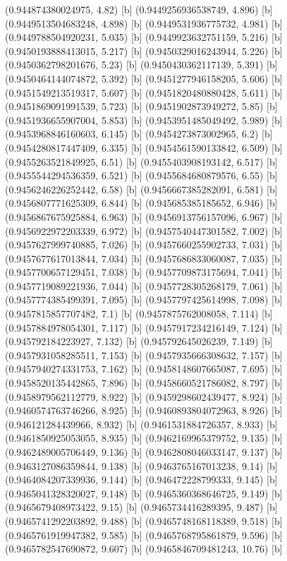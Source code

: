 {{{(0.944874380024975, 4.82) [b] 
(0.9449256936538749, 4.896) [b] 
(0.9449513504683248, 4.898) [b] 
(0.9449531936775732, 4.981) [b] 
(0.9449788504920231, 5.035) [b] 
(0.9449923632751159, 5.216) [b] 
(0.9450193888413015, 5.217) [b] 
(0.9450329016243944, 5.226) [b] 
(0.9450362798201676, 5.23) [b] 
(0.9450430362117139, 5.391) [b] 
(0.9450464144074872, 5.392) [b] 
(0.9451277946158205, 5.606) [b] 
(0.9451549213519317, 5.607) [b] 
(0.9451820480880428, 5.611) [b] 
(0.9451869091991539, 5.723) [b] 
(0.9451902873949272, 5.85) [b] 
(0.9451936655907004, 5.853) [b] 
(0.9453951485049492, 5.989) [b] 
(0.9453968846160603, 6.145) [b] 
(0.9454273873002965, 6.2) [b] 
(0.9454280817447409, 6.335) [b] 
(0.9454561590133842, 6.509) [b] 
(0.9455263521849925, 6.51) [b] 
(0.9455403908193142, 6.517) [b] 
(0.9455544294536359, 6.521) [b] 
(0.9455684680879576, 6.55) [b] 
(0.9456246226252442, 6.58) [b] 
(0.9456667385282091, 6.581) [b] 
(0.9456807771625309, 6.844) [b] 
(0.945685385185652, 6.946) [b] 
(0.9456867675925884, 6.963) [b] 
(0.9456913756157096, 6.967) [b] 
(0.9456922972203339, 6.972) [b] 
(0.9457540447301582, 7.002) [b] 
(0.9457627999740885, 7.026) [b] 
(0.9457660255902733, 7.031) [b] 
(0.9457677617013844, 7.034) [b] 
(0.9457686833060087, 7.035) [b] 
(0.9457700657129451, 7.038) [b] 
(0.9457709873175694, 7.041) [b] 
(0.9457719089221936, 7.044) [b] 
(0.9457728305268179, 7.061) [b] 
(0.9457774385499391, 7.095) [b] 
(0.9457797425614998, 7.098) [b] 
(0.9457815857707482, 7.1) [b] 
(0.9457875762008058, 7.114) [b] 
(0.9457884978054301, 7.117) [b] 
(0.9457917234216149, 7.124) [b] 
(0.945792184223927, 7.132) [b] 
(0.945792645026239, 7.149) [b] 
(0.9457931058285511, 7.153) [b] 
(0.9457935666308632, 7.157) [b] 
(0.9457940274331753, 7.162) [b] 
(0.9458148607665087, 7.695) [b] 
(0.9458520135442865, 7.896) [b] 
(0.9458660521786082, 8.797) [b] 
(0.9458979562112779, 8.922) [b] 
(0.9459298602439477, 8.924) [b] 
(0.9460574763746266, 8.925) [b] 
(0.9460893804072963, 8.926) [b] 
(0.946121284439966, 8.932) [b] 
(0.9461531884726357, 8.933) [b] 
(0.9461850925053055, 8.935) [b] 
(0.9462169965379752, 9.135) [b] 
(0.9462489005706449, 9.136) [b] 
(0.9462808046033147, 9.137) [b] 
(0.9463127086359844, 9.138) [b] 
(0.9463765167013238, 9.14) [b] 
(0.9464084207339936, 9.144) [b] 
(0.946472228799333, 9.145) [b] 
(0.9465041328320027, 9.148) [b] 
(0.9465360368646725, 9.149) [b] 
(0.9465679408973422, 9.15) [b] 
(0.9465734416289395, 9.487) [b] 
(0.9465741292203892, 9.488) [b] 
(0.9465748168118389, 9.518) [b] 
(0.9465761919947382, 9.585) [b] 
(0.9465768795861879, 9.596) [b] 
(0.9465782547690872, 9.607) [b] 
(0.9465846709481243, 10.76) [b] 
}}}
